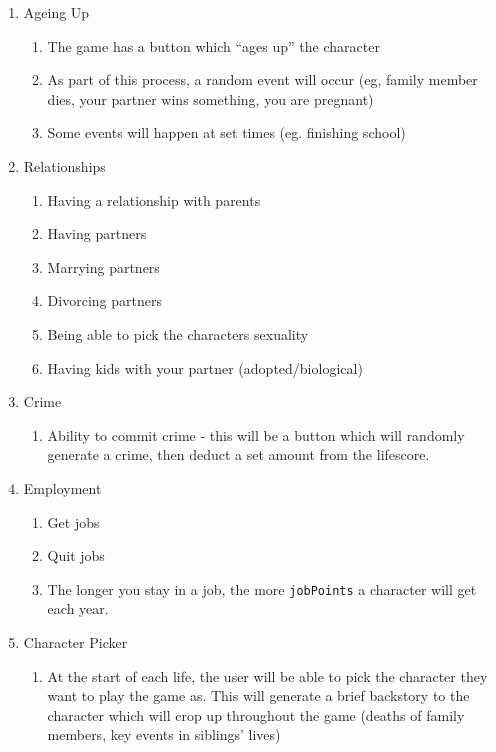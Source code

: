 \begin{enumerate}
    \item Ageing Up
    \begin{enumerate}
        \item The game has a button which “ages up” the character
        \item As part of this process, a random event will occur (eg, family member dies, your partner wins something, you are pregnant)
        \item Some events will happen at set times (eg. finishing school)
    \end{enumerate}
    \item Relationships
    \begin{enumerate}
        \item Having a relationship with parents
        \item Having partners
        \item Marrying partners
        \item Divorcing partners
        \item Being able to pick the characters sexuality
        \item Having kids with your partner (adopted/biological)
    \end{enumerate}
    \item Crime
    \begin{enumerate}
        \item Ability to commit crime - this will be a button which will randomly generate a crime, then deduct a set amount from the lifescore.
    \end{enumerate}
    \item Employment
    \begin{enumerate}
        \item Get jobs
        \item Quit jobs
        \item The longer you stay in a job, the more \verb|jobPoints| a character will get each year. 
    \end{enumerate}
    \item Character Picker
    \begin{enumerate}
        \item At the start of each life, the user will be able to pick the character they want to play the game as. This will generate a brief backstory to the character which will crop up throughout the game (deaths of family members, key events in siblings' lives)
    \end{enumerate}

\end{enumerate}
